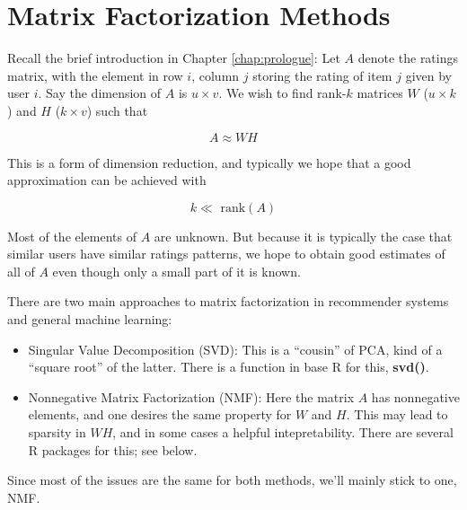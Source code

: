 \chapter{Matrix Factorization Methods}  
\label{chap:svd} 


Recall the brief introduction in Chapter \ref{chap:prologue}:  Let $A$
denote the ratings matrix, with the element in row $i$, column $j$
storing the rating of item $j$ given by user $i$.  Say the dimension of
$A$ is $u \times v$.  We wish to find rank-$k$ matrices $W$
($u \times k$) and $H$ ($k \times v$) such that

\begin{equation}
\label{awh}
A \approx W H
\end{equation}

This is a form of dimension reduction, and typically we hope that a good
approximation can be achieved with

\begin{equation}
k \ll \textrm{ rank}(A)
\end{equation}

Most of the elements of $A$ are unknown.  But because
it is typically the case that similar users have similar ratings
patterns, we hope to obtain good estimates of all of $A$ even though
only a small part of it is known.

There are two main approaches to matrix factorization in recommender
systems and general machine learning:

\begin{itemize}

\item Singular Value Decomposition (SVD):  This is a ``cousin'' of PCA,
kind of a ``square root'' of the latter.  There is a function in base R
for this, \textbf{svd()}.

\item Nonnegative Matrix Factorization (NMF): Here the matrix $A$ has
nonnegative elements, and one desires the same property for $W$ and $H$.
This may lead to sparsity in $WH$, and in some cases a helpful
intepretability.  There are several R packages for this; see below.

\end{itemize} 

Since most of the issues are the same for both methods, we'll mainly stick
to one, NMF.

